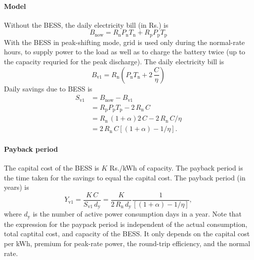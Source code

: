 \paragraph{Model}

Without the BESS, the daily electricity bill (in Rs.) is
\begin{equation}
    B_{\text{now}} = 
    R_{\text{n}} P_{\text{n}} T_{\text{n}}  +
    R_{\text{p}} P_{\text{p}} T_{\text{p}} 
\end{equation}
With the BESS in peak-shifting mode, grid is used only during the normal-rate
hours, to supply power to the load as well as to charge the battery twice (up to
the capacity requried for the peak discharge).  The daily electricity bill is
\begin{equation}
    \label{eq:bv1}
    B_{\text{v1}} = 
    R_\text{n} \left(P_{\text{n}}  T_{\text{n}}  +  
     2 \, \frac{C}{\eta} \right)
\end{equation}
Daily savings due to BESS is
\begin{align}
    S_\text{v1} & = B_{\text{now}} - B_{\text{v1}} \\
    & =  R_{\text{p}} P_{\text{p}} T_{\text{p}} - 2 \, R_\text{n} \, C \\
    & =  R_{\text{n}} \, (1+ \alpha) 2 \, C - 2 \, R_\text{n} \, C/\eta  \\
    & =   2 \, R_{\text{n}} \, C \left[   (1 + \alpha) - 1/\eta \right].
    \label{eq:sv1}
\end{align}

\paragraph{Payback period} The capital cost of the BESS is $K$ Rs./kWh
of capacity. The payback period is the time taken for the savings to
equal the capital cost. The payback period (in years) is
\begin{equation}
    \label{eq:pb1}
    Y_\text{v1} = \frac{K \, C}{S_\text{v1} \, d_\text{y}} 
    = \frac{K}{2 \, R_\text{n} \, d_\text{y}} \frac{1}{\left[  (1 + \alpha)
    - 1/\eta\right]},
\end{equation} 
where $d_\text{y}$ is the number of active power consumption days in a year. 
Note that the expression for the paypack period is independent of the
actual consumption, total captital cost, and capacity of the BESS. It
only depends on the capital cost per kWh, premium for peak-rate power,
the round-trip efficiency, and the normal rate.

